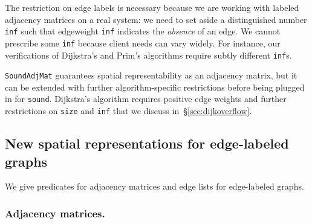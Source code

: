 The restriction on edge labels is necessary because we are working
with labeled adjacency matrices on a real system: we need to set aside
a distinguished number \texttt{inf} such that edgeweight \texttt{inf}
indicates the \emph{absence} of an edge. We cannot
prescribe some \texttt{inf} because client needs can vary widely. For
instance, our verifications of Dijkstra's and Prim's algorithms
require subtly different \texttt{inf}s.

\texttt{SoundAdjMat} guarantees spatial representability
as an adjacency matrix, but it can be extended with further
algorithm-specific restrictions before
being plugged in for \texttt{sound}. Dijkstra's algorithm
requires positive edge weights and further restrictions on
\texttt{size} and \texttt{inf} that we discuss in~\S\ref{sec:dijkoverflow}.

\subsection{New spatial representations for edge-labeled graphs}
\label{sec:newspatial}

We give predicates for adjacency matrices and edge lists
for edge-labeled graphs.

\subsubsection{Adjacency matrices.}

